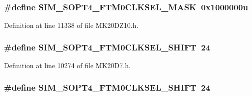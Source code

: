 \subsubsection[{\texorpdfstring{S\+I\+M\+\_\+\+S\+O\+P\+T4\+\_\+\+F\+T\+M0\+C\+L\+K\+S\+E\+L\+\_\+\+M\+A\+SK}{SIM_SOPT4_FTM0CLKSEL_MASK}}]{\setlength{\rightskip}{0pt plus 5cm}\#define S\+I\+M\+\_\+\+S\+O\+P\+T4\+\_\+\+F\+T\+M0\+C\+L\+K\+S\+E\+L\+\_\+\+M\+A\+SK~0x1000000u}\hypertarget{group___s_i_m___register___masks_gaac823c598ac790d9eeeeb7ddb86d1657}{}\label{group___s_i_m___register___masks_gaac823c598ac790d9eeeeb7ddb86d1657}


Definition at line 11338 of file M\+K20\+D\+Z10.\+h.

\subsubsection[{\texorpdfstring{S\+I\+M\+\_\+\+S\+O\+P\+T4\+\_\+\+F\+T\+M0\+C\+L\+K\+S\+E\+L\+\_\+\+S\+H\+I\+FT}{SIM_SOPT4_FTM0CLKSEL_SHIFT}}]{\setlength{\rightskip}{0pt plus 5cm}\#define S\+I\+M\+\_\+\+S\+O\+P\+T4\+\_\+\+F\+T\+M0\+C\+L\+K\+S\+E\+L\+\_\+\+S\+H\+I\+FT~24}\hypertarget{group___s_i_m___register___masks_ga77c42e9023c3ed2d759431e2c072860f}{}\label{group___s_i_m___register___masks_ga77c42e9023c3ed2d759431e2c072860f}


Definition at line 10274 of file M\+K20\+D7.\+h.

\subsubsection[{\texorpdfstring{S\+I\+M\+\_\+\+S\+O\+P\+T4\+\_\+\+F\+T\+M0\+C\+L\+K\+S\+E\+L\+\_\+\+S\+H\+I\+FT}{SIM_SOPT4_FTM0CLKSEL_SHIFT}}]{\setlength{\rightskip}{0pt plus 5cm}\#define S\+I\+M\+\_\+\+S\+O\+P\+T4\+\_\+\+F\+T\+M0\+C\+L\+K\+S\+E\+L\+\_\+\+S\+H\+I\+FT~24}\hypertarget{group___s_i_m___register___masks_ga77c42e9023c3ed2d759431e2c072860f}{}\label{group___s_i_m___register___masks_ga77c42e9023c3ed2d759431e2c072860f}


